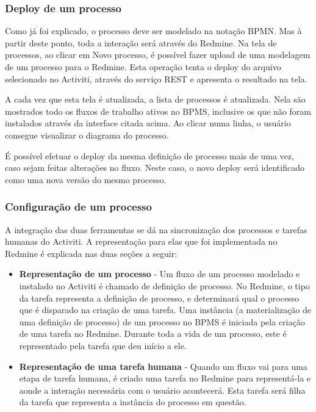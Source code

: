 \subsubsection{Deploy de um processo}\label{sec:integracao_redmine_activiti_inplementacao_funcionalidades_deploy}
Como já foi explicado, o processo deve ser modelado na notação BPMN. Mas à partir deste ponto, toda a interação será através do Redmine.
Na tela de processos, ao clicar em Novo processo, é possível fazer upload de uma modelagem de um processo para o Redmine. Esta operação tenta o deploy do arquivo selecionado no Activiti, através do serviço REST e apresenta o resultado na tela.

A cada vez que esta tela é atualizada, a lista de processos é atualizada. Nela são mostrados todo os fluxos de trabalho ativos no BPMS, inclusive os que não foram instalados através da interface citada acima. Ao clicar numa linha, o usuário consegue visualizar o diagrama do processo.

É possível efetuar o deploy da mesma definição de processo mais de uma vez, caso sejam feitas alterações no fluxo. Neste caso, o novo deploy será identificado como uma nova versão do mesmo processo. 

\subsubsection{Configuração de um processo}\label{sec:integracao_redmine_activiti_inplementacao_funcionalidades_configuracao}
A integração das duas ferramentas se dá na sincronização dos processos e tarefas humanas do Activiti. A representação para elas que foi implementada no Redmine é explicada nas duas seções a seguir:

\begin{itemize}
\item \textbf{Representação de um processo} - Um fluxo de um processo modelado e instalado no Activiti é chamado de definição de processo. No Redmine, o tipo da tarefa representa a definição de processo, e determinará qual o processo que é disparado na criação de uma tarefa. Uma instância (a materialização de uma definição de processo) de um processo no BPMS é iniciada pela criação de uma tarefa no Redmine. Durante toda a vida de um processo, este é representado pela tarefa que deu início a ele. 

\item \textbf{Representação de uma tarefa humana} - Quando um fluxo vai para uma etapa de tarefa humana, é criado uma tarefa no Redmine para representá-la e aonde a interação necessária com o usuário acontecerá. Esta tarefa será filha da tarefa que representa a instância do processo em questão.
\end{itemize}

